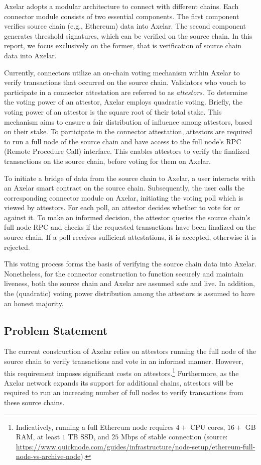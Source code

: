 Axelar adopts a modular architecture to connect with different chains. Each connector module consists of two essential components. The first component verifies source chain (e.g., Ethereum) data into Axelar. The second component generates threshold signatures, which can be verified on the source chain. In this report, we focus exclusively on the former, that is verification of source chain data into Axelar.

Currently, connectors utilize an on-chain voting mechanism within Axelar to verify transactions that occurred on the source chain. Validators who vouch to participate in a connector attestation are referred to as \emph{attestors}. To determine the voting power of an attestor, Axelar employs quadratic voting. Briefly, the voting power of an attestor is the square root of their total stake. This mechanism aims to ensure a fair distribution of influence among attestors, based on their stake. To participate in the connector attestation, attestors are required to run a full node of the source chain and have access to the full node's RPC (Remote Procedure Call) interface. This enables attestors to verify the finalized transactions on the source chain, before voting for them on Axelar.

To initiate a bridge of data from the source chain to Axelar, a user interacts with an Axelar smart contract on the source chain. Subsequently, the user calls the corresponding connector module on Axelar, initiating the voting poll which is viewed by attestors. For each poll, an attestor decides whether to vote for or against it. To make an informed decision, the attestor queries the source chain's full node RPC and checks if the requested
transactions have been finalized on the source chain. If a poll receives sufficient attestations, it is accepted, otherwise it is rejected. 

This voting process forms the basis of verifying the source chain data into Axelar. 
Nonetheless, for the connector construction to function securely and maintain liveness, both the source chain and Axelar are assumed safe and live. In addition, the (quadratic) voting power distribution among the attestors is assumed to have an honest majority.

\subsection{Problem Statement}
The current construction of Axelar relies on attestors running the full node of the source chain to verify transactions and vote in an informed manner. However, this requirement imposes significant costs on attestors.\footnote{Indicatively, running a full Ethereum node requires $4+$ CPU cores, $16+$ GB RAM, at least $1$ TB SSD, and $25$ Mbps of stable connection (source: \url{https://www.quicknode.com/guides/infrastructure/node-setup/ethereum-full-node-vs-archive-node}).} 
Furthermore, as the Axelar network expands its support for additional chains, attestors will be required to run an increasing number of full nodes to verify transactions from these source chains.

